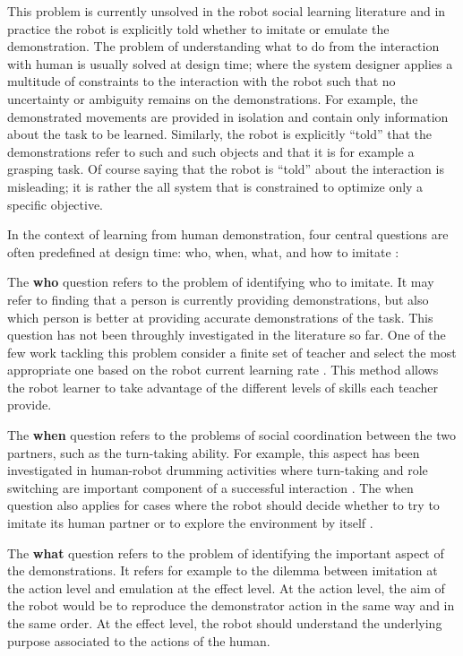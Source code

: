 This problem is currently unsolved in the robot social learning literature and in practice the robot is explicitly told whether to imitate or emulate the demonstration. The problem of understanding what to do from the interaction with human is usually solved at design time; where the system designer applies a multitude of constraints to the interaction with the robot such that no uncertainty or ambiguity remains on the demonstrations. For example, the demonstrated movements are provided in isolation and contain only information about the task to be learned. Similarly, the robot is explicitly ``told'' that the demonstrations refer to such and such objects and that it is for example a grasping task. Of course saying that the robot is ``told'' about the interaction is misleading; it is rather the all system that is constrained to optimize only a specific objective.

In the context of learning from human demonstration, four central questions are often predefined at design time: who, when, what, and how to imitate \cite{nehaniv2000hummingbirds}:

The \textbf{who} question refers to the problem of identifying who to imitate. It may refer to finding that a person is currently providing demonstrations, but also which person is better at providing accurate demonstrations of the task. This question has not been throughly investigated in the literature so far. One of the few work tackling this problem consider a finite set of teacher and select the most appropriate one based on the robot current learning rate \cite{Nguyen2012PJBR}. This method allows the robot learner to take advantage of the different levels of skills each teacher provide.

The \textbf{when} question refers to the problems of social coordination between the two partners, such as the turn-taking ability. For example, this aspect has been investigated in human-robot drumming activities where turn-taking and role switching are important component of a successful interaction \cite{weinberg2006robot,kose2008emergent}. The when question also applies for cases where the robot should decide whether to try to imitate its human partner or to explore the environment by itself \cite{chernova09jair,Nguyen2012PJBR}. 

The \textbf{what} question refers to the problem of identifying the important aspect of the demonstrations. It refers for example to the dilemma between imitation at the action level and emulation at the effect level. At the action level, the aim of the robot would be to reproduce the demonstrator action in the same way and in the same order. At the effect level, the robot should understand the underlying purpose associated to the actions of the human.


